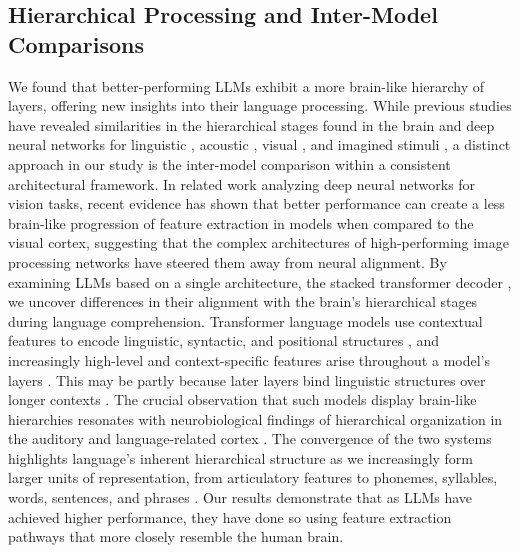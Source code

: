 \subsection{Hierarchical Processing and Inter-Model Comparisons}
We found that better-performing LLMs exhibit a more brain-like hierarchy of layers, offering new insights into their language processing. While previous studies have revealed similarities in the hierarchical stages found in the brain and deep neural networks for linguistic \cite{caucheteux2023evidence, caucheteux2022brains, kumar2022reconstructing}, acoustic \cite{giordano2023intermediate, tuckute2023many}, visual \cite{kriegeskorte2015deep, cichy2016comparison, sexton2022reassessing}, and imagined stimuli \cite{horikawa2017hierarchical}, a distinct approach in our study is the inter-model comparison within a consistent architectural framework. In related work analyzing deep neural networks for vision tasks, recent evidence \cite{nonaka2021brain} has shown that better performance can create a less brain-like progression of feature extraction in models when compared to the visual cortex, suggesting that the complex architectures of high-performing image processing networks have steered them away from neural alignment. By examining LLMs based on a single architecture, the stacked transformer decoder \cite{vaswani2017attention}, we uncover differences in their alignment with the brain's hierarchical stages during language comprehension. Transformer language models use contextual features to encode linguistic, syntactic, and positional structures \cite{o2021context, clark2019does}, and increasingly high-level and context-specific features arise throughout a model’s layers \cite{ethayarajh2019contextual, tenney2019bert}. This may be partly because later layers bind linguistic structures over longer contexts \cite{skrill2023large}. The crucial observation that such models display brain-like hierarchies resonates with neurobiological findings of hierarchical organization in the auditory and language-related cortex \cite{hickok2007cortical, sharpee2011hierarchical, sheng2019cortical, ding2017characterizing, hasson2008hierarchy, lerner2011topographic, norman2022multiscale, de2017hierarchical}. The convergence of the two systems highlights language's inherent hierarchical structure as we increasingly form larger units of representation, from articulatory features to phonemes, syllables, words, sentences, and phrases \cite{keshishian2023joint, di2021neural, gong2023phonemic}. Our results demonstrate that as LLMs have achieved higher performance, they have done so using feature extraction pathways that more closely resemble the human brain.

